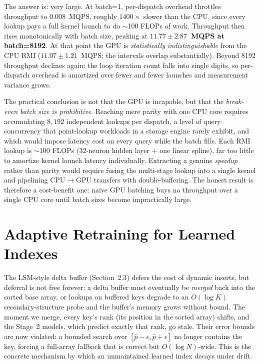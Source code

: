 \documentclass[sigconf,nonacm]{acmart}
\begin{document}
The answer is: very large. At batch=1, per-dispatch overhead throttles throughput to $0.008$~MQPS, roughly $1400\times$ slower than the CPU, since every lookup pays a full kernel launch to do $\sim$100 FLOPs of work. Throughput then rises monotonically with batch size, peaking at \textbf{$11.77 \pm 2.87$~MQPS at batch=8192}. At that point the GPU is \textit{statistically indistinguishable} from the CPU RMI ($11.07 \pm 1.21$~MQPS; the intervals overlap substantially). Beyond 8192 throughput declines again: the loop iteration count falls into single digits, so per-dispatch overhead is amortized over fewer and fewer launches and measurement variance grows.

The practical conclusion is not that the GPU is incapable, but that the \textit{break-even batch size is prohibitive}. Reaching mere parity with one CPU core requires accumulating $8{,}192$ independent lookups per dispatch, a level of query concurrency that point-lookup workloads in a storage engine rarely exhibit, and which would impose latency cost on every query while the batch fills. Each RMI lookup is $\sim$100 FLOPs (32-neuron hidden layer $+$ one linear spline), far too little to amortize kernel launch latency individually. Extracting a genuine \textit{speedup} rather than parity would require fusing the multi-stage lookup into a single kernel and pipelining CPU$\to$GPU transfers with double-buffering. The honest result is therefore a cost-benefit one: naive GPU batching buys no throughput over a single CPU core until batch sizes become impractically large.

\section{Adaptive Retraining for Learned Indexes}

The LSM-style delta buffer (Section~2.3) defers the cost of dynamic inserts, but deferral is not free forever: a delta buffer must eventually be \textit{merged} back into the sorted base array, or lookups on buffered keys degrade to an $O(\log K)$ secondary-structure probe and the buffer's memory grows without bound. The moment we merge, every key's rank (its position in the sorted array) shifts, and the Stage~2 models, which predict exactly that rank, go stale. Their error bounds are now violated: a bounded search over $[\hat{p}-\epsilon,\hat{p}+\epsilon]$ no longer contains the key, forcing a full-array fallback that is correct but $O(\log N)$-wide. This is the concrete mechanism by which an unmaintained learned index decays under drift.
\end{document}
